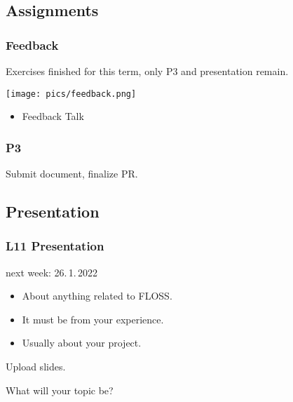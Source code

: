 \breakframe


\breakframe

\subsection{Assignments}

\begin{frame}
	\frametitle{Feedback}
	Exercises finished for this term, only P3 and presentation remain.

	\hfill \texttt{[image: pics/feedback.png]}
	\vspace{-1cm}
	\begin{itemize}
		\item Feedback Talk
	\end{itemize}
\end{frame}

\begin{assignment}
	\frametitle{P3}

	\begin{task}
	Submit document, finalize PR.
	\end{task}
\end{assignment}

\subsection{Presentation}

\begin{frame}
	\frametitle{L11 Presentation}

	next week: 26.\,1.\,2022

	\begin{itemize}
		\item About anything related to FLOSS.
		\item It must be from your experience.
		\item Usually about your project.
	\end{itemize}

	\begin{task}
	Upload slides.
	\end{task}

	\begin{task}
	What will your topic be?
	\end{task}
\end{frame}

\appendix

\begin{frame}[allowframebreaks]
	
	
\end{frame}



